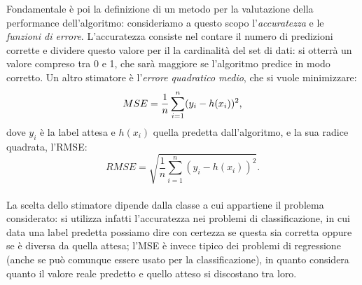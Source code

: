 \documentclass[oneside, openany]{book}
\begin{document}
		Fondamentale è poi la definizione di un metodo per la valutazione della performance dell'algoritmo: consideriamo a questo scopo l'\textit{accuratezza} e le \textit{funzioni di errore}. L'accuratezza consiste nel contare il numero di predizioni corrette e dividere questo valore per il la cardinalità del set di dati: si otterrà un valore compreso tra 0 e 1, che sarà maggiore se l'algoritmo predice in modo corretto. Un altro stimatore è l'\textit{errore quadratico medio}, che si vuole minimizzare:\\
		\[
		MSE={1\over n}\sum_{i=1}^n (y_i-h(x_i))^2\text{,}
		\]
		dove $y_i$ è la label attesa e $h(x_i)$ quella predetta dall'algoritmo, e la sua radice quadrata, l'RMSE:\\
		\[
		RMSE = \sqrt{\frac{1}{n}\sum_{i=1}^{n}(y_{i} - h(x_{i}))^{2}}\text{.}
		\]\\
		La scelta dello stimatore dipende dalla classe a cui appartiene il problema considerato: si utilizza infatti l'accuratezza nei problemi di classificazione, in cui data una label predetta possiamo dire con certezza se questa sia corretta oppure se è diversa da quella attesa; l'MSE è invece tipico dei problemi di regressione (anche se può comunque essere usato per la classificazione), in quanto considera quanto il valore reale predetto e quello atteso si discostano tra loro.
		
\end{document}
